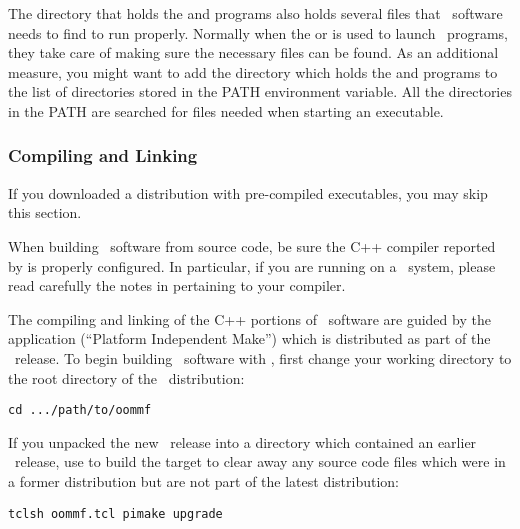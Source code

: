 The directory that holds the  and  programs also
holds several {} files that \OOMMF\ software needs to find to
run properly.  Normally when the  or
 is
used to launch \OOMMF\ programs, they take care of making sure the
necessary {} files can be found.  As an additional measure,
you might want to add the directory which holds the  and
 programs to the list of directories stored in the
PATH environment variable.  All the
directories in the PATH are searched for {} files needed when
starting an executable.  

\subsubsection{Compiling and Linking}\label{sec:install.compile}

If you downloaded a distribution with pre-compiled executables, you may
skip this section.

When building \OOMMF\ software from source code, be sure the C++
compiler reported by  is properly configured.
In particular, if you are running on a \Windows\ system, please read
carefully the notes in 
  pertaining to your
compiler.

The compiling and linking of the C++ portions of \OOMMF\ software 
are guided by the application
(``Platform Independent Make'') which 
is distributed as part of the \OOMMF\ release.
To begin building \OOMMF\ software with , first change
your working directory
to the root directory of the \OOMMF\ distribution:
\begin{verbatim}
cd .../path/to/oommf
\end{verbatim}

If you unpacked the new \OOMMF\ release into a directory 
which contained an earlier \OOMMF\ release, 
use  to build the target 
to clear away any source code files which were 
in a former distribution but are not part of the latest distribution:
\begin{verbatim}
tclsh oommf.tcl pimake upgrade
\end{verbatim}

